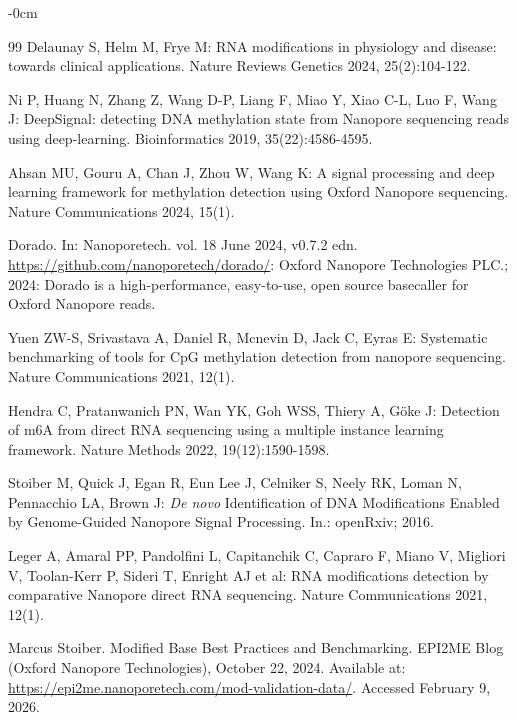 \documentclass[journal,article,submit,pdftex,moreauthors]{Definitions/mdpi}
\begin{document}
\begin{adjustwidth}{-\extralength}{0cm}
\begin{thebibliography}{99}
Delaunay S, Helm M, Frye M: RNA modifications in physiology and disease: towards clinical applications. Nature Reviews Genetics 2024, 25(2):104-122.

Ni P, Huang N, Zhang Z, Wang D-P, Liang F, Miao Y, Xiao C-L, Luo F, Wang J: DeepSignal: detecting DNA methylation state from Nanopore sequencing reads using deep-learning. Bioinformatics 2019, 35(22):4586-4595.

Ahsan MU, Gouru A, Chan J, Zhou W, Wang K: A signal processing and deep learning framework for methylation detection using Oxford Nanopore sequencing. Nature Communications 2024, 15(1).

Dorado. In: Nanoporetech. vol. 18 June 2024, v0.7.2 edn. \url{https://github.com/nanoporetech/dorado/}: Oxford Nanopore Technologies PLC.; 2024: Dorado is a high-performance, easy-to-use, open source basecaller for Oxford Nanopore reads.

Yuen ZW-S, Srivastava A, Daniel R, Mcnevin D, Jack C, Eyras E: Systematic benchmarking of tools for CpG methylation detection from nanopore sequencing. Nature Communications 2021, 12(1).

Hendra C, Pratanwanich PN, Wan YK, Goh WSS, Thiery A, Göke J: Detection of m6A from direct RNA sequencing using a multiple instance learning framework. Nature Methods 2022, 19(12):1590-1598.

Stoiber M, Quick J, Egan R, Eun Lee J, Celniker S, Neely RK, Loman N, Pennacchio LA, Brown J: \textit{De novo} Identification of DNA Modifications Enabled by Genome-Guided Nanopore Signal Processing. In.: openRxiv; 2016.

Leger A, Amaral PP, Pandolfini L, Capitanchik C, Capraro F, Miano V, Migliori V, Toolan-Kerr P, Sideri T, Enright AJ et al: RNA modifications detection by comparative Nanopore direct RNA sequencing. Nature Communications 2021, 12(1).

Marcus Stoiber.
\newblock Modified Base Best Practices and Benchmarking.
\newblock EPI2ME Blog (Oxford Nanopore Technologies), October 22, 2024.
\newblock Available at: \url{https://epi2me.nanoporetech.com/mod-validation-data/}. Accessed February 9, 2026.
\end{thebibliography}
\PublishersNote{}
\end{adjustwidth}
\end{document}
